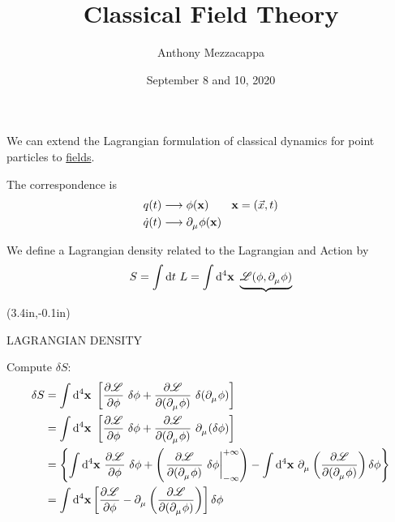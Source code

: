 \documentclass{article}
\title{Classical Field Theory}
\author{Anthony Mezzacappa}
\date{September 8 and 10, 2020}
\begin{document}
\setlength{\parskip}{1em}
\maketitle

\noindent We can extend the Lagrangian formulation of classical dynamics for point particles to \underline{fields}.

\noindent The correspondence is
\begin{align*}
    q (t) &\longrightarrow \phi (\mathbf{x}) \qquad \mathbf{x} = ( \vec{x}, t ) \\
    \dot{q} (t) &\longrightarrow \tensor{\partial}{_\mu} \phi (\mathbf{x})
\end{align*}

\noindent We define a Lagrangian density related to the Lagrangian and Action by
\begin{equation*}
    S = \int \mathrm{d}t~ L = \int \mathrm{d}^4 \mathbf{x}~ \underbrace{ \mathscr{L} ( \phi, \tensor{\partial}{_\mu} \phi ) }
\end{equation*}
{%
\begin{textblock*}{3in}(3.4in,-0.1in)%
\begin{minipage}[h!]{3in}
    LAGRANGIAN DENSITY
\end{minipage}%
\end{textblock*}%
}

\noindent Compute $\delta S$:
\begin{align*}
    \delta S &= \int \mathrm{d}^4 \mathbf{x}~ \left[ \dfrac{ \partial \mathscr{L} }{ \partial \phi } ~ \delta \phi + \dfrac{ \partial \mathscr{L} }{ \partial( \tensor{\partial}{_\mu} \phi ) } ~ \delta ( \tensor{\partial}{_\mu} \phi ) \right] \\
    &= \int \mathrm{d}^4 \mathbf{x}~ \left[ \dfrac{ \partial \mathscr{L} }{ \partial \phi } ~ \delta \phi + \dfrac{ \partial \mathscr{L} }{ \partial( \tensor{\partial}{_\mu} \phi ) } ~ \tensor{\partial}{_\mu} ( \delta \phi ) \right] \\
    &= \left\lbrace \int \mathrm{d}^4 \mathbf{x}~ \dfrac{ \partial \mathscr{L} }{ \partial \phi } ~ \delta \phi + \left( \left. \dfrac{ \partial \mathscr{L} }{ \partial( \tensor{\partial}{_\mu} \phi ) } ~ \delta \phi \right|_{-\infty}^{+\infty} \right) - \int \mathrm{d}^4 \mathbf{x}~ \tensor{\partial}{_\mu} \left( \dfrac{ \partial \mathscr{L} }{ \partial( \tensor{\partial}{_\mu} \phi ) } \right) \delta \phi \right\rbrace \\
    &= \int \mathrm{d}^4 \mathbf{x} \left[ \dfrac{ \partial \mathscr{L} }{ \partial \phi } - \tensor{\partial}{_\mu} \left( \dfrac{ \partial \mathscr{L} }{ \partial( \tensor{\partial}{_\mu} \phi ) } \right) \right] \delta \phi
\end{align*}
\end{document}
